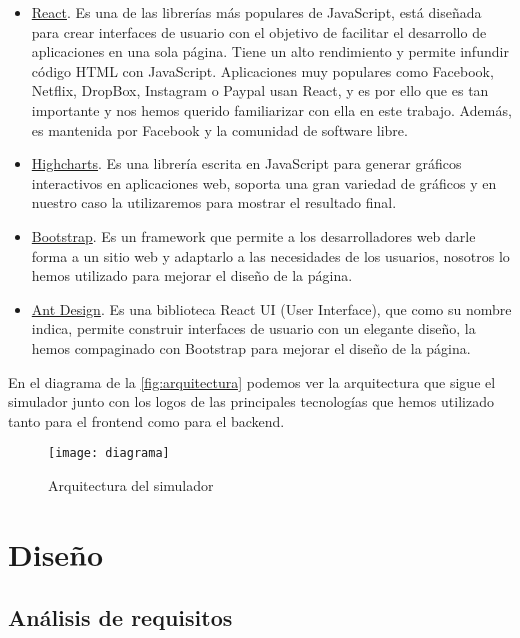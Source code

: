 \begin{itemize}
	\item \href{https://es.react.dev}{React}. Es una de las librerías más populares de JavaScript, está diseñada para crear interfaces de usuario con el objetivo de facilitar el desarrollo de aplicaciones en una sola página. Tiene un alto rendimiento y permite infundir código HTML con JavaScript. Aplicaciones muy populares como Facebook, Netflix, DropBox, Instagram o Paypal usan React, y es por ello que es tan importante y nos hemos querido familiarizar con ella en este trabajo. Además, es mantenida por Facebook y la comunidad de software libre.
	\item \href{https://www.highcharts.com}{Highcharts}. Es una librería escrita en JavaScript para generar gráficos interactivos en aplicaciones web, soporta una gran variedad de gráficos y en nuestro caso la utilizaremos para mostrar el resultado final.
	\item \href{https://getbootstrap.com}{Bootstrap}. Es un framework que permite a los desarrolladores web darle forma a un sitio web y adaptarlo a las necesidades de los usuarios, nosotros lo hemos utilizado para mejorar el diseño de la página.
	\item \href{https://ant.design}{Ant Design}. Es una biblioteca React UI (User Interface), que como su nombre indica, permite construir interfaces de usuario con un elegante diseño, la hemos compaginado con Bootstrap para mejorar el diseño de la página.
\end{itemize}
En el diagrama de la \autoref{fig:arquitectura} podemos ver la arquitectura que sigue el simulador junto con los logos de las principales tecnologías que hemos utilizado tanto para el frontend como para el backend.
\begin{figure}[h!]
	\centering
	\texttt{[image: diagrama]}
	\caption{Arquitectura del simulador}
	\label{fig:arquitectura}
\end{figure}
\section{Diseño}
\subsection{Análisis de requisitos}
